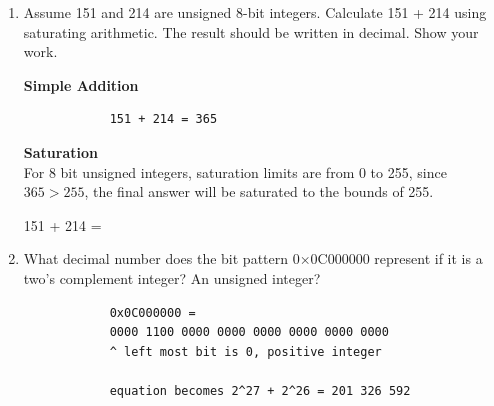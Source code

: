\documentclass{article}
\begin{document}
\begin{enumerate}
        \textbf{214 in Two's Complement to obtain original value}
        \begin{verbatim}
                0000 0010 (carry)
                0010 1001 (flip 1's and 0's)
            +           1 (add 1)
            -------------
                0010 1010
        \end{verbatim}

        \textbf{Convert numbers back to decimal}
        \begin{verbatim}
            (151) 0110 1001 = 105
            (214) 0010 1010 = 42
        \end{verbatim}

        \textbf{Perform operation}\\[0.25in]
        105 - 42 = \\[0.25in]
        For 8-bit signed integers, saturation limits are from $-128$ to $127$, since $-128\leq63\leq127$, no saturation is required.

        \item Assume 151 and 214 are unsigned 8-bit integers. Calculate 151 + 214 using saturating arithmetic. The result should be written in decimal. Show your work.
        
        \textbf{Simple Addition}
        \begin{verbatim}
            151 + 214 = 365
        \end{verbatim}

        \textbf{Saturation}\\
        For 8 bit unsigned integers, saturation limits are from 0 to 255, since $365 > 255$, the final answer will be saturated to the bounds of 255.

        151 + 214 = 

        \item What decimal number does the bit pattern 0×0C000000 represent if it is a two's complement integer? An unsigned integer?
        \begin{verbatim}
            0x0C000000 = 
            0000 1100 0000 0000 0000 0000 0000 0000
            ^ left most bit is 0, positive integer

            equation becomes 2^27 + 2^26 = 201 326 592
        \end{verbatim}
        \begin{center}
            \\
            \\
        \end{center}
        

\end{enumerate}
\end{document}

